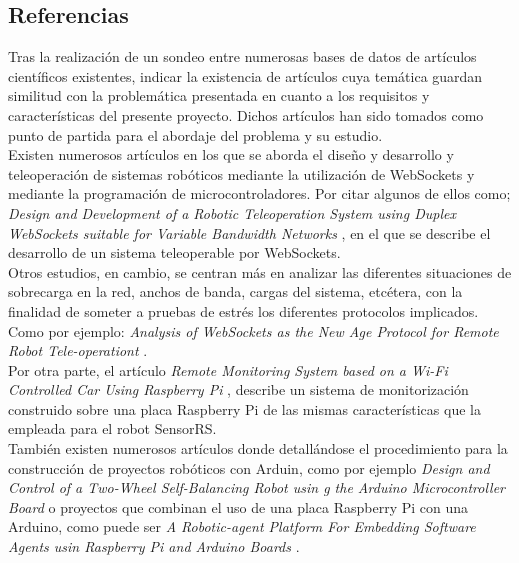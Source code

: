 \subsection{ Referencias }
\label{sec:referencias}

Tras la realización de un sondeo entre numerosas bases de datos de artículos científicos existentes, indicar la existencia de artículos cuya temática guardan similitud con la problemática presentada
en cuanto a los requisitos y características del presente proyecto. Dichos artículos han sido tomados como punto de partida para el abordaje del problema y su estudio.\\

Existen numerosos artículos en los que se aborda el diseño y desarrollo y teleoperación de sistemas robóticos mediante la utilización de WebSockets y mediante la programación de microcontroladores. Por citar algunos de ellos como; \emph{Design and Development of a Robotic Teleoperation System using
Duplex WebSockets suitable for Variable Bandwidth Networks} \cite{article:1}, en el que se describe el desarrollo de un sistema teleoperable por WebSockets.\\
  
Otros estudios, en cambio, se centran más en analizar las diferentes situaciones de sobrecarga en la red, anchos de banda, cargas del sistema, etcétera, con la finalidad de someter a pruebas de estrés
los diferentes protocolos implicados. Como por ejemplo: \emph{Analysis of WebSockets as the New Age Protocol for Remote Robot Tele-operationt} \cite{article:2}.\\
  
Por otra parte, el artículo \emph{ Remote Monitoring System based on a Wi-Fi Controlled Car Using Raspberry Pi } \cite{article:3}, describe un sistema de monitorización construido sobre una placa 
Raspberry Pi de las mismas características que la empleada para el robot SensorRS.\\ 
  
  
También existen numerosos artículos donde detallándose el procedimiento para la construcción de proyectos robóticos con Arduin, como por ejemplo \emph{Design and Control of a Two-Wheel Self-Balancing Robot usin
g the Arduino Microcontroller Board} \cite{article-4} o proyectos que combinan el uso de una placa Raspberry Pi con una Arduino, como puede ser \emph{A Robotic-agent Platform For Embedding Software Agents usin Raspberry Pi and Arduino Boards} \cite{article:5}.\\
  
